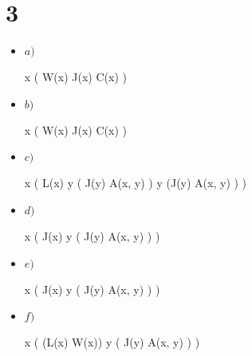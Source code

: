 \documentclass[12pt, fleqn]{article}                            %
\def \Eq {equation}                                             %
\newenvironment{MultiLineEquation*}[1]                          %
        {\begin{\Eq*}\begin{alignedat}{#1}}                         %
        {\end{alignedat}\end{\Eq*}}                                 %
\theoremstyle{break}                                            %
\newcommand \lLongTo {\longrightarrow}                          %
\begin{document}
\section{3}

    \begin{itemize}
        
        \item $a)$
            \begin{MultiLineEquation*}{3}
                \exists x ( W(x) \wedge J(x) \wedge C(x) )
            \end{MultiLineEquation*}

        \item $b)$
            \begin{MultiLineEquation*}{3}
                \forall x \neg ( W(x) \wedge J(x) \wedge C(x) )
            \end{MultiLineEquation*}

        \item $c)$
            \begin{MultiLineEquation*}{3}
                \exists x ( 
                L(x) 
                \wedge 
                \forall y ( \neg J(y) \lLongTo \neg A(x, y) ) 
                \wedge 
                \exists y (J(y) \wedge A(x, y) ) 
                )
            \end{MultiLineEquation*}

        \item $d)$
            \begin{MultiLineEquation*}{3}
                \forall x ( 
                J(x) \lLongTo
                \forall y ( \neg J(y) \lLongTo \neg A(x, y) ) 
                )
            \end{MultiLineEquation*}

        \item $e)$
            \begin{MultiLineEquation*}{3}
                \forall x ( 
                \neg J(x) \lLongTo
                \forall y ( J(y) \lLongTo \neg A(x, y) ) 
                )
            \end{MultiLineEquation*}

        \item $f)$
            \begin{MultiLineEquation*}{3}
                \forall x ( 
                (L(x) \wedge W(x)) \lLongTo
                \exists y ( J(y) \lLongTo A(x, y) ) 
                )
            \end{MultiLineEquation*}
                
    \end{itemize}
\end{document}

